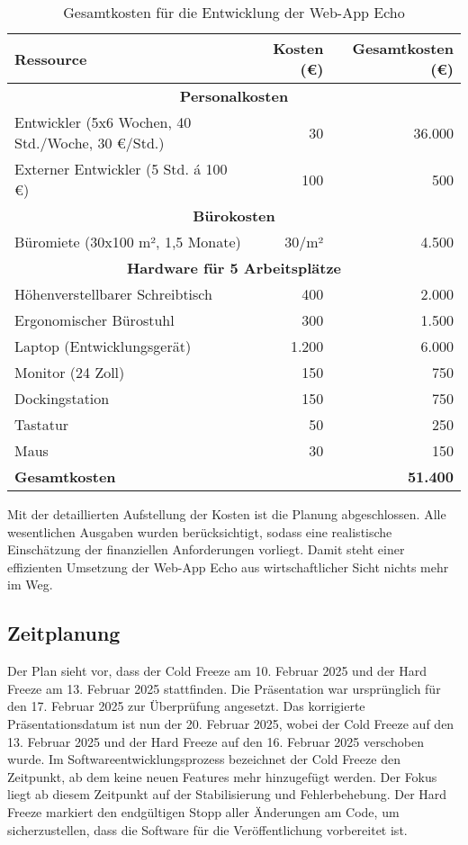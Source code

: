 \documentclass[a4paper,12pt]{article}
\begin{document}
\begin{table}[h]
    \centering
    \renewcommand{\arraystretch}{1.2}
    \setlength{\tabcolsep}{6pt}
    \small
    \begin{tabular}{|p{9cm}|r|r|}
        \hline
        \textbf{Ressource} & \textbf{Kosten (€)} & \textbf{Gesamtkosten (€)} \\
        \hline
        \multicolumn{3}{|c|}{\textbf{Personalkosten}} \\
        \hline
        Entwickler (5x6 Wochen, 40 Std./Woche, 30 €/Std.) & 30 & 36.000 \\
        Externer Entwickler (5 Std. á 100 €) & 100 & 500 \\
        \hline
        \multicolumn{3}{|c|}{\textbf{Bürokosten}} \\
        \hline
        Büromiete (30x100 m², 1,5 Monate) & 30/m² & 4.500 \\
        \hline
        \multicolumn{3}{|c|}{\textbf{Hardware für 5 Arbeitsplätze}} \\
        \hline
        Höhenverstellbarer Schreibtisch & 400 & 2.000 \\
        Ergonomischer Bürostuhl & 300 & 1.500 \\
        Laptop (Entwicklungsgerät) & 1.200 & 6.000 \\
        Monitor (24 Zoll) & 150 & 750 \\
        Dockingstation & 150 & 750 \\
        Tastatur & 50 & 250 \\
        Maus & 30 & 150 \\
        \hline
        \textbf{Gesamtkosten} & & \textbf{51.400} \\
        \hline
    \end{tabular}
    \caption{Gesamtkosten für die Entwicklung der Web-App Echo}
\end{table}

Mit der detaillierten Aufstellung der Kosten ist die Planung abgeschlossen.
Alle wesentlichen Ausgaben wurden berücksichtigt, sodass eine realistische
Einschätzung der finanziellen Anforderungen vorliegt. Damit steht einer
effizienten Umsetzung der Web-App Echo aus wirtschaftlicher Sicht nichts mehr
im Weg.

\subsection{Zeitplanung}
Der Plan sieht vor, dass der Cold Freeze am 10. Februar 2025 und der Hard
Freeze am 13. Februar 2025 stattfinden. Die Präsentation war ursprünglich für
den 17. Februar 2025 zur Überprüfung angesetzt. Das korrigierte
Präsentationsdatum ist nun der 20. Februar 2025, wobei der Cold Freeze auf den
13. Februar 2025 und der Hard Freeze auf den 16. Februar 2025 verschoben wurde.
Im Softwareentwicklungsprozess bezeichnet der Cold Freeze den Zeitpunkt, ab dem
keine neuen Features mehr hinzugefügt werden. Der Fokus liegt ab diesem
Zeitpunkt auf der Stabilisierung und Fehlerbehebung. Der Hard Freeze markiert
den endgültigen Stopp aller Änderungen am Code, um sicherzustellen, dass die
Software für die Veröffentlichung vorbereitet ist.
\end{document}
